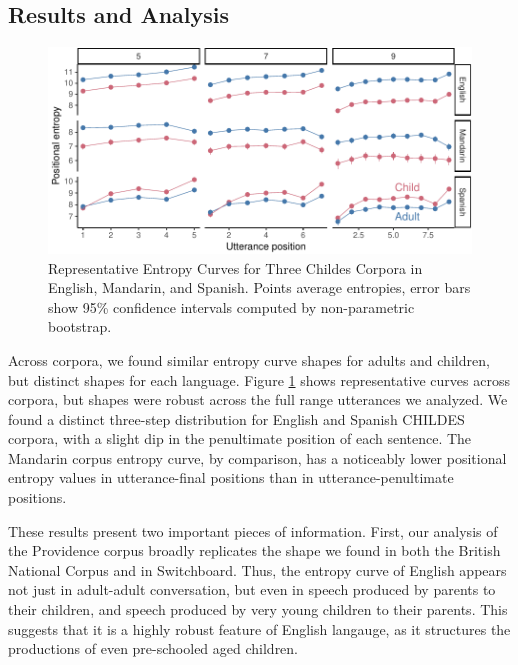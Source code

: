 \documentclass[10pt, letterpaper]{article}
\newenvironment{CodeChunk}{}{}
\begin{document}
\hypertarget{results-and-analysis}{%
\subsection{Results and Analysis}\label{results-and-analysis}}

\begin{CodeChunk}
\begin{figure}[tb]

{\centering \includegraphics{figs/plot_childes-1} 

}

\caption[Representative Entropy Curves for Three Childes Corpora in English, Mandarin, and Spanish]{Representative Entropy Curves for Three Childes Corpora in English, Mandarin, and Spanish. Points average entropies, error bars show 95\% confidence intervals computed by non-parametric bootstrap.}\label{fig:plot_childes}
\end{figure}
\end{CodeChunk}

Across corpora, we found similar entropy curve shapes for adults and
children, but distinct shapes for each language. Figure
\ref{fig:plot_childes} shows representative curves across corpora, but
shapes were robust across the full range utterances we analyzed. We
found a distinct three-step distribution for English and Spanish CHILDES
corpora, with a slight dip in the penultimate position of each sentence.
The Mandarin corpus entropy curve, by comparison, has a noticeably lower
positional entropy values in utterance-final positions than in
utterance-penultimate positions.

These results present two important pieces of information. First, our
analysis of the Providence corpus broadly replicates the shape we found
in both the British National Corpus and in Switchboard. Thus, the
entropy curve of English appears not just in adult-adult conversation,
but even in speech produced by parents to their children, and speech
produced by very young children to their parents. This suggests that it
is a highly robust feature of English langauge, as it structures the
productions of even pre-schooled aged children.
\end{document}
